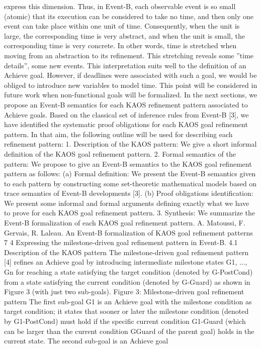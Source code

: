 express this dimension. Thus, in Event-B, each observable event is so small (atomic) that
its execution can be considered to take no time, and then only one event can take place
within one unit of time. Consequently, when the unit is large, the corresponding time is very
abstract, and when the unit is small, the corresponding time is very concrete. In other words,
time is stretched when moving from an abstraction to its refinement. This stretching reveals
some ”time details”, some new events. This interpretation suits well to the definition of an
Achieve goal. However, if deadlines were associated with such a goal, we would be obliged
to introduce new variables to model time. This point will be considered in future work when
non-functional goals will be formalized.
In the next sections, we propose an Event-B semantics for each KAOS refinement pattern
associated to Achieve goals. Based on the classical set of inference rules from Event-B [3],
we have identified the systematic proof obligations for each KAOS goal refinement pattern.
In that aim, the following outline will be used for describing each refinement pattern:
1. Description of the KAOS pattern: We give a short informal definition of the KAOS
goal refinement pattern.
2. Formal semantics of the pattern: We propose to give an Event-B semantics to the
KAOS goal refinement pattern as follows:
(a) Formal definition: We present the Event-B semantics given to each pattern by
constructing some set-theoretic mathematical models based on trace semantics of
Event-B developments [3].
(b) Proof obligations identification: We present some informal and formal arguments defining exactly what we have to prove for each KAOS goal refinement
pattern.
3. Synthesis: We summarize the Event-B formalization of each KAOS goal refinement
pattern.
A. Matoussi, F. Gervais, R. Laleau. An Event-B formalization of KAOS goal refinement patterns 7
4 Expressing the milestone-driven goal refinement pattern in
Event-B.
4.1 Description of the KAOS pattern
The milestone-driven goal refinement pattern [4] refines an Achieve goal by introducing intermediate milestone states G1, ..., Gn for reaching a state satisfying the target condition (denoted by G-PostCond) from a state satisfying the current condition (denoted by G-Guard)
as shown in Figure 3 (with just two sub-goals).
Figure 3: Milestone-driven goal refinement pattern
The first sub-goal G1 is an Achieve goal with the milestone condition as target condition;
it states that sooner or later the milestone condition (denoted by G1-PostCond) must hold if
the specific current condition G1-Guard (which can be larger than the current condition GGuard of the parent goal) holds in the current state. The second sub-goal is an Achieve goal
